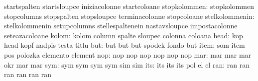                                   startspalten                     startsloupce
                                  iniziacolonne                    startcoloane
                    stopkolommen: stopkolommen                     stopcolumns
                                  stopspalten                      stopsloupce
                                  terminacolonne                   stopcoloane
                  stelkolommenin: stelkolommenin                   setupcolumns
                                  stellespaltenein                 nastavsloupce
                                  impostacolonne                   seteazacoloane
                           kolom: kolom                            column
                                  spalte                           sloupec
                                  colonna                          coloana
                            head: kop                              head
                                  kopf                             nadpis
                                  testa                            titlu %
                             but: but                              but
                                  but                              spodek
                                  fondo                            but
                            item: som                              item
                                  pos                              polozka
                                  elemento                         element
                             nop: nop                              nop
                                  nop                              nop
                                  nop                              nop
                             mar: mar                              mar
                                  mar                              okr
                                  mar                              mar
                             sym: sym                              sym
                                  sym                              sym
                                  sim                              sim
                             its: its                              its
                                  its                              pol %
                                  el                               el  %
                             ran: ran                              ran
                                  ran                              ran
                                  ran                              ran
